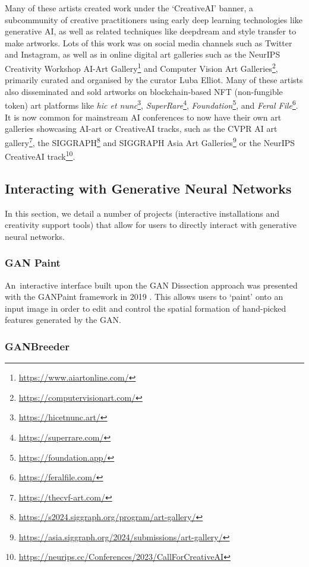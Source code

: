 Many of these artists created work under the `CreativeAI' banner, a subcommunity of creative practitioners using early deep learning technologies like generative AI, as well as related techniques like deepdream and style transfer \citep{gatys2016neural} to make artworks. 
Lots of this work was on social media channels such as Twitter and Instagram, as well as in online digital art galleries such as the NeurIPS Creativity Workshop AI-Art Gallery\footnote{\url{https://www.aiartonline.com/}} and Computer Vision Art Galleries\footnote{\url{https://computervisionart.com/}}, primarily curated and organised by the curator Luba Elliot. 
Many of these artists also disseminated and sold artworks on blockchain-based NFT (non-fungible token) art platforms like \textit{hic et nunc}\footnote{\url{https://hicetnunc.art/}}, \textit{SuperRare}\footnote{\url{https://superrare.com/}}, \textit{Foundation}\footnote{\url{https://foundation.app/}}, and \textit{Feral File}\footnote{\url{https://feralfile.com/}}. 
It is now common for mainstream AI conferences to now have their own art galleries showcasing AI-art or CreativeAI tracks, such as the CVPR AI art gallery\footnote{\url{https://thecvf-art.com/}}, the SIGGRAPH\footnote{\url{https://s2024.siggraph.org/program/art-gallery/}} and SIGGRAPH Asia Art Galleries\footnote{\url{https://asia.siggraph.org/2024/submissions/art-gallery/}} or the NeurIPS CreativeAI track\footnote{\url{https://neurips.cc/Conferences/2023/CallForCreativeAI}}.

\subsection{Interacting with Generative Neural Networks} 

In this section, we detail a number of projects (interactive installations and creativity support tools) that allow for users to directly interact with generative neural networks.

\subsubsection{GAN Paint}

An~interactive interface built upon the GAN Dissection approach \citep{Bau2018-td} was presented with the GANPaint framework in 2019 \citep{bau2019semantic}. 
This allows users to `paint' onto an input image in order to edit and control the spatial formation of hand-picked features generated by the GAN. 

\subsubsection{GANBreeder}

